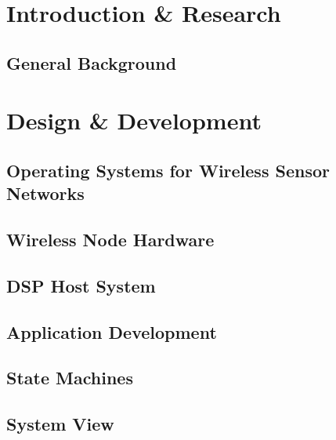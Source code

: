 \part{Introduction \& Research}
\chapter{General Background}





\part{Design \& Development} 
\chapter{Operating Systems for Wireless Sensor Networks}



\chapter{Wireless Node Hardware}

\chapter{DSP Host System}



\chapter{Application Development}



\chapter{State Machines}



\chapter{System View}









